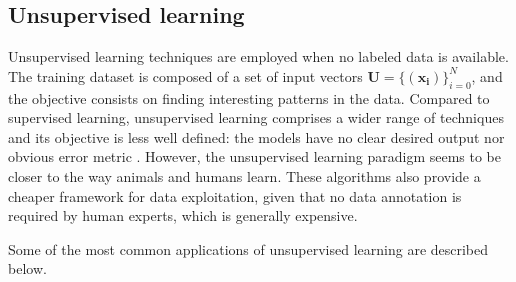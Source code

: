\subsection{Unsupervised learning}
Unsupervised learning techniques are employed when no labeled data is available. The training dataset is composed of a set of input vectors $\mathbf{U}=\{(\mathbf{x_i})\}_{i=0}^{N}$, and the objective consists on finding interesting patterns in the data. Compared to supervised learning, unsupervised learning comprises a wider range of techniques and its objective is less well defined: the models have no clear desired output nor obvious error metric \autocite{Goodfellow2016}. However, the unsupervised learning paradigm seems to be closer to the way animals and humans learn. These algorithms also provide a cheaper framework for data exploitation, given that no data annotation is required by human experts, which is generally expensive.

Some of the most common applications of unsupervised learning are described below.

